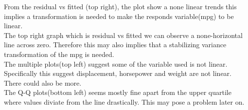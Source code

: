 \documentclass[11pt]{article} %
\begin{document}
From the residual vs fitted (top right), the plot show a none linear trends this implies a transformation is needed to make the responds variable(mpg) to be linear.\\
The top right graph which is residual vs fitted we can observe a none-horizontal line across zero. Therefore this may also implies that a stabilizing variance transformation of the mpg is needed.\\
The multiple plots(top left) suggest some of the variable used is not linear. Specifically this suggest displacement, horsepower and weight are not linear. There could also be more.\\
The Q-Q plots(bottom left) seems mostly fine apart from the upper quartile where values diviate from the line drastically. This may pose a problem later on.
\end{document}
